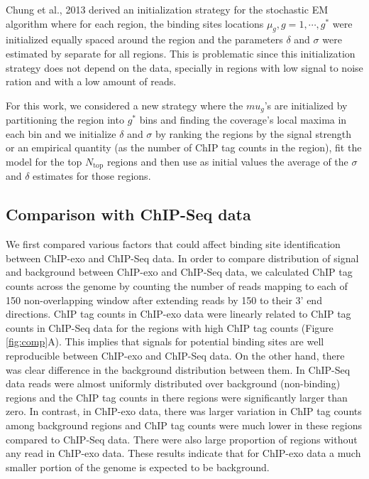 \documentclass[11pt]{article}\usepackage[]{graphicx}\usepackage[]{color}
\begin{document}
Chung et al., 2013 \cite{dpeak} derived an initialization strategy for
the stochastic EM algorithm where for each region, the binding sites
locations $\mu_g, g=1,\cdots,g^*$ were initialized equally spaced
around the region and the parameters $\delta$ and $\sigma$ were
estimated by separate for all regions. This is problematic since this
initialization strategy does not depend on the data, specially in
regions with low signal to noise ration and with a low amount of
reads.

For this work, we considered a new strategy where the $mu_g$'s are
initialized by partitioning the region into $g^*$ bins and finding the
coverage's local maxima in each bin and we initialize $\delta$ and
$\sigma$ by ranking the regions by the signal strength or an empirical
quantity (as the number of ChIP tag counts in the region), fit the
model for the top $N_{\text{top}}$ regions and then use as initial
values the average of the $\sigma$ and $\delta$ estimates for those
regions.

\subsection{Comparison with ChIP-Seq data}
\label{sec:comp_chipseq}



We first compared various factors that could affect binding site
identification between ChIP-exo and ChIP-Seq data. In order to compare
distribution of signal and background between ChIP-exo and ChIP-Seq
data, we calculated ChIP tag counts across the genome by counting the
number of reads mapping to each of 150 non-overlapping
window after extending reads by 150 to their 3' end
directions. ChIP tag counts in ChIP-exo data were linearly related to
ChIP tag counts in ChIP-Seq data for the regions with high ChIP tag
counts (Figure \ref{fig:comp}A). This implies that signals for
potential binding sites are well reproducible between ChIP-exo and
ChIP-Seq data. On the other hand, there was clear difference in the
background distribution between them. In ChIP-Seq data reads were
almost uniformly distributed over background (non-binding) regions and
the ChIP tag counts in there regions were significantly larger than
zero. In contrast, in ChIP-exo data, there was larger variation in
ChIP tag counts among background regions and ChIP tag counts were much
lower in these regions compared to ChIP-Seq data. There were also
large proportion of regions without any read in ChIP-exo data. These
results indicate that for ChIP-exo data a much smaller portion of the
genome is expected to be background.
\end{document}
